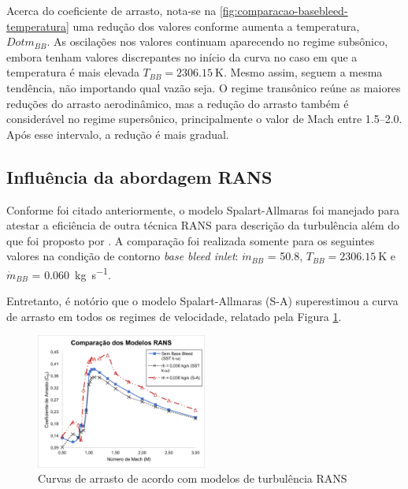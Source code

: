 Acerca do coeficiente de arrasto, nota-se na \autoref{fig:comparacao-basebleed-temperatura} uma redução dos valores conforme aumenta a temperatura, \(Dot{m}_{BB}\). As oscilações nos valores continuam aparecendo no regime subsônico, embora tenham valores discrepantes no início da curva no caso em que a temperatura é mais elevada \(T_{BB} = \qty{2306,15}{\kelvin}\). Mesmo assim, seguem a mesma tendência, não importando qual vazão seja. O regime transônico reúne as maiores reduções do arrasto aerodinâmico, mas a redução do arrasto também é considerável no regime supersônico, principalmente o valor de Mach entre \numrange{1,5}{2,0}. Após esse intervalo, a redução é mais gradual.

\subsection{Influência da abordagem RANS}\label{subsec:resultados-com-basebleed-RANS}

Conforme foi citado anteriormente, o modelo Spalart-Allmaras \cite{Spalart1992} foi manejado para atestar a eficiência de outra técnica RANS para descrição da turbulência além do que foi proposto por \citeauthor{Menter1994TwoequationET}. A comparação foi realizada somente para os seguintes valores na condição de contorno \textit{base bleed inlet}: \(\Dot{m}_{BB}\) = \qty{50,8}{\millimetre}, \(T_{BB} = \qty{2306,15}{\kelvin}\) e \(\Dot{m}_{BB}\) = \qty{0,060}{\kilogram\per\second}.

Entretanto, é notório que o modelo Spalart-Allmaras (S-A) superestimou a curva de arrasto em todos os regimes de velocidade, relatado pela Figura \ref{fig:comparacao-bb-rans}.

\begin{figure}[!ht]
    \centering
    \includegraphics[width=0.5\textwidth]{cd-combasebleed-rans.png}
 	\caption{Curvas de arrasto de acordo com modelos de turbulência RANS}
    \label{fig:comparacao-bb-rans}
\end{figure}

